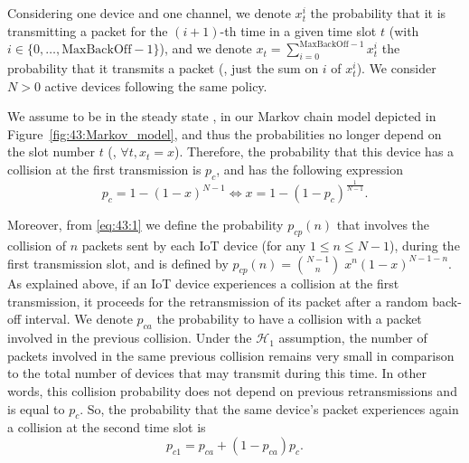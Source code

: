 Considering one device and one channel,
we denote $x_t^i$ the probability that it is transmitting a packet for the $(i+1)$-th time in a given time slot $t$ (with $i\in \{0, \dots, \mathrm{MaxBackOff}-1 \}$),
and we denote $x_t = \sum_{i=0}^{\mathrm{MaxBackOff}-1}x_t^i$ the probability that it transmits a packet (\ie, just the sum on $i$ of $x_t^i$).
We consider $N > 0$ active devices following the same policy.

%

We assume to be in the steady state \cite{Norris98}, in our Markov chain model depicted in Figure~\ref{fig:43:Markov_model}, and thus the probabilities no longer depend on the slot number $t$ (\ie, $\forall t, x_t=x$).
Therefore, the probability that this device has a collision at the first transmission is $p_c$, and has the following expression
%
\begin{equation}\label{eq:43:1}
	p_c = 1-\left(1-x\right)^{N-1} \iff x = 1-\left(1-p_c\right)^{\frac{1}{N-1}}.
\end{equation}

Moreover, from \eqref{eq:43:1} we define the probability $p_{cp}(n)$ that involves the collision of $n$ packets sent by each IoT device (for any $1\leq n \leq N-1$), during the first transmission slot, and is defined by $p_{cp}(n) = {N-1 \choose n} \; x^n \left(1-x\right)^{N-1-n}$.
%
As explained above, if an IoT device experiences a collision at the first transmission, it proceeds for the retransmission of its packet after a random back-off interval.
We denote $p_{ca}$ the probability to have a collision with a packet involved in the previous collision.
Under the $\mathcal{H}_{1}$ assumption, the number of packets involved in the same previous collision remains very small in comparison to the total number of devices that may transmit during this time. In other words, this collision probability does not depend on previous retransmissions and is equal to $p_c$.
So, the probability that the same device's packet experiences again a collision at the second time slot is
%
\begin{equation}\label{eq:43:decomppc1}
	p_{c1} = p_{ca}+\left(1-p_{ca} \right)p_c.
\end{equation}


